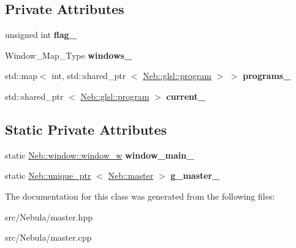\subsection*{\-Private \-Attributes}
\begin{DoxyCompactItemize}
\item 
\hypertarget{classNeb_1_1master_af71a3359ab168f9d2f7ddc58fbc20772}{unsigned int {\bfseries flag\-\_\-}}\label{classNeb_1_1master_af71a3359ab168f9d2f7ddc58fbc20772}

\item 
\hypertarget{classNeb_1_1master_afcef76720ef4ad6ce4c3a83985047f8e}{\-Window\-\_\-\-Map\-\_\-\-Type {\bfseries windows\-\_\-}}\label{classNeb_1_1master_afcef76720ef4ad6ce4c3a83985047f8e}

\item 
\hypertarget{classNeb_1_1master_a8b03fc85ddea1fa9ae61c28cc7cf8fbc}{std\-::map$<$ int, std\-::shared\-\_\-ptr\*
$<$ \hyperlink{classNeb_1_1glsl_1_1program}{\-Neb\-::glsl\-::program} $>$ $>$ {\bfseries programs\-\_\-}}\label{classNeb_1_1master_a8b03fc85ddea1fa9ae61c28cc7cf8fbc}

\item 
\hypertarget{classNeb_1_1master_a83ebd2a7ae36bde1ab9c6f23bc2fa302}{std\-::shared\-\_\-ptr\*
$<$ \hyperlink{classNeb_1_1glsl_1_1program}{\-Neb\-::glsl\-::program} $>$ {\bfseries current\-\_\-}}\label{classNeb_1_1master_a83ebd2a7ae36bde1ab9c6f23bc2fa302}

\end{DoxyCompactItemize}
\subsection*{\-Static \-Private \-Attributes}
\begin{DoxyCompactItemize}
\item 
\hypertarget{classNeb_1_1master_ab43b29dfb8f37694c89f08411a68f267}{static \hyperlink{classNeb_1_1weak__ptr}{\-Neb\-::window\-::window\-\_\-w} {\bfseries window\-\_\-main\-\_\-}}\label{classNeb_1_1master_ab43b29dfb8f37694c89f08411a68f267}

\item 
\hypertarget{classNeb_1_1master_a0151ff558558393aa9aff680a66f0c31}{static \hyperlink{classNeb_1_1unique__ptr}{\-Neb\-::unique\-\_\-ptr}\*
$<$ \hyperlink{classNeb_1_1master}{\-Neb\-::master} $>$ {\bfseries g\-\_\-master\-\_\-}}\label{classNeb_1_1master_a0151ff558558393aa9aff680a66f0c31}

\end{DoxyCompactItemize}


\-The documentation for this class was generated from the following files\-:\begin{DoxyCompactItemize}
\item 
src/\-Nebula/master.\-hpp\item 
src/\-Nebula/master.\-cpp\end{DoxyCompactItemize}
